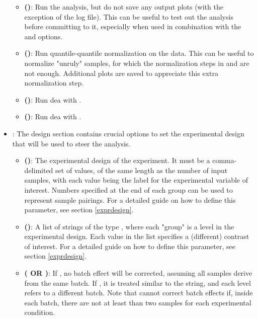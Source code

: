 \begin{itemize}
    \begin{itemize}
        \item \textbf{ ()}: Run the analysis, but do not save any output plots (with the exception of the log file). This can be useful to test out the analysis before committing to it, especially when used in combination with the  and  options.
        \item \textbf{ ()}: Run quantile-quantile normalization on the data. This can be useful to normalize "unruly" samples, for which the normalization steps in  and  are not enough. Additional plots are saved to appreciate this extra normalization step.
        \item \textbf{ ()}: Run \gls{dea} with .
        \item \textbf{ ()}: Run \gls{dea} with .
    \end{itemize}
    \item \textbf{}: The design section contains crucial options to set the experimental design that will be used to steer the analysis.
    \begin{itemize}
        \item \textbf{ ()}: The experimental design of the experiment. It must be a comma-delimited set of values, of the same length as the number of input samples, with each value being the label for the experimental variable of interest. Numbers specified at the end of each group can be used to represent sample pairings. For a detailed guide on how to define this parameter, see section \ref{exprdesign}.
        \item \textbf{ ()}: A list of strings of the type , where each "group" is a level in the experimental design. Each value in the list specifies a (different) contrast of interest. For a detailed guide on how to define this parameter, see section \ref{exprdesign}.
        \item \textbf{ ( OR )}: If , no batch effect will be corrected, assuming all samples derive from the same batch. If , it is treated similar to the  string, and each level refers to a different batch. Note that  cannot correct batch effects if, inside each batch, there are not at least than two samples for each experimental condition.

\end{itemize}
\end{itemize}
